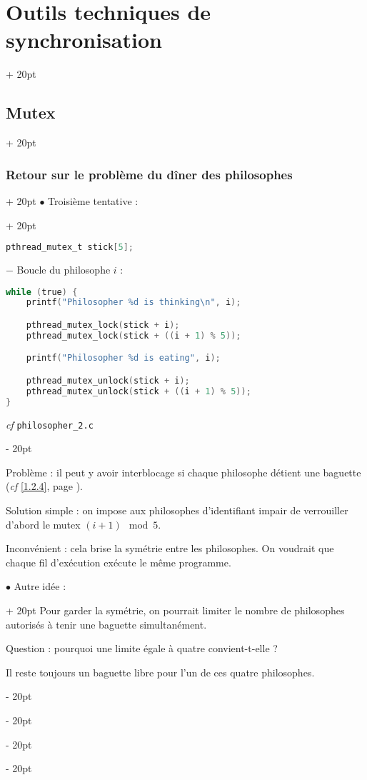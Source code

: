 \documentclass[a4paper, 12pt, twoside]{article}
\newcommand{\ind}[1][20pt]{\advance\leftskip + #1}
\newcommand{\deind}[1][20pt]{\advance\leftskip - #1}
\newenvironment{indt}[2][20pt]{#2 \par \ind[#1]}{\par \deind} %
\begin{document}
\begin{indt}{\section{Outils techniques de synchronisation}}
\begin{indt}{\subsection{Mutex}}
\begin{indt}{\subsubsection{Retour sur le problème du dîner des philosophes}}
\begin{indt}{$\bullet$ Troisième tentative :}
                    \begin{lstlisting}[language=C, xleftmargin=100pt]
pthread_mutex_t stick[5];\end{lstlisting}

                    $-$ Boucle du philosophe $i$ :

                    \begin{lstlisting}[language=C, xleftmargin=100pt]
while (true) {
    printf("Philosopher %d is thinking\n", i);

    pthread_mutex_lock(stick + i);
    pthread_mutex_lock(stick + ((i + 1) % 5));

    printf("Philosopher %d is eating", i);

    pthread_mutex_unlock(stick + i);
    pthread_mutex_unlock(stick + ((i + 1) % 5));
}\end{lstlisting}

                    \textit{cf} \texttt{philosopher\_2.c}
                \end{indt}

                \vspace{12pt}
                
                Problème : il peut y avoir interblocage si chaque philosophe détient une baguette (\textit{cf} \ref{1.2.4}, page \pageref{1.2.4}).

                \vspace{12pt}
                
                Solution simple : on impose aux philosophes d'identifiant impair de verrouiller d'abord le mutex $(i + 1) \mod 5$.

                Inconvénient : cela brise la symétrie entre les philosophes. On voudrait que chaque fil d'exécution exécute le même programme.

                \vspace{12pt}
                
                \begin{indt}{$\bullet$ Autre idée :}
                    Pour garder la symétrie, on pourrait limiter le nombre de philosophes autorisés à tenir une baguette simultanément.

                    Question : pourquoi une limite égale à quatre convient-t-elle ?

                    Il reste toujours un baguette libre pour l'un de ces quatre philosophes.

                    \begin{center}
\end{center}
\end{indt}
\end{indt}
\end{indt}
\end{indt}
\end{document}
